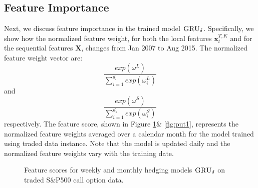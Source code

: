 \documentclass[letterpaper,12pt,titlepage,oneside,final]{book}
\numberwithin{equation}{section}
\theoremstyle{definition}
\newcommand{\model}{\textsc{GRU}_\delta}
\newcommand{\vx}{\mathbf{x}}
\begin{document}
\subsection{Feature Importance}\label{sec:featureWeek}
Next, we discuss feature importance in the trained model $\model$. Specifically, we show how the normalized feature weight, for both the local features $\vx_{t}^{T,K}$ and for the sequential features $\mathbf{X}$,  changes from Jan 2007 to Aug 2015. 
The normalized feature weight vector are:
\[
\frac{exp(\omega^L)}{\sum_{i=1}^{d_l} exp(\omega^L_i)}
\]
and
\[
\frac{exp(\omega^S)}{\sum_{i=1}^{d_s} exp(\omega^S_i)}
\]
respectively.
The feature score, shown in Figure \ref{fig:call1}\& \ref{fig:put1}, represents the normalized feature weights averaged over a calendar month for the model trained using {traded} data instance. Note that
the model is updated daily and  the normalized feature weights vary with the training date.
\begin{figure}[htp]
\centering
\caption{Feature scores for weekly and monthly hedging models $\model$ on  traded S\&P500 call option  data.} \label{fig:call1}
\end{figure}
\end{document}
